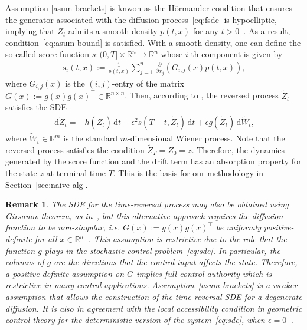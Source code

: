 \documentclass[letterpaper, 10 pt, conference]{ieeeconf}  %
\def\Re{\mathbb{R}}
\def\R{\mathbb{R}}
\newcommand{\field}[1]{\mathbb{#1}}
\def\Re{\field{R}}
\def\R{\mathbb{R}}
\newtheorem{remark}{Remark}
\newcommand{\ud}{\,\mathrm{d}}
\def\Re{\mathbb{R}}
\renewcommand{\Re}{\mathbb{R}}
\begin{document}
Assumption \ref{asum-brackets} is knwon as the H\"ormander condition that ensures the generator associated with the diffusion process~\eqref{eq:fsde} is hypoelliptic, implying that $Z_t$ admits a smooth density $p(t,x)$ for any $t>0$~\cite{chaleyat1984hypoellipticity,hormander1967hypoelliptic}. As a result, condition~\eqref{eq:asum-bound} is satisfied. With a smooth density, one can define the so-called score function $s:(0,T] \times \Re^n \to \Re^n$ whose $i$-th component is given by
  \begin{align}\label{eq:score-def}
            s_i(t,x) \mathrel{:=} \frac{1}{p(t,x)} \sum_{j=1}^n  \frac{\partial}{\partial x_j}(G_{i,j}(x)p(t,x)),
        \end{align}
        where $G_{i,j}(x)$ is the $(i,j)$-entry of the matrix $G(x):=g(x)g(x)^\top \in \R^{n\times n}$. 
Then, according to \cite[Thm. 2.1]{haussmann1986time},
the reversed process $\tilde Z_t$ satisfies the SDE
\begin{align}
            \ud \tilde{Z}_t = -h(\tilde Z_t)\ud t +  \epsilon^2 s(T-t,\tilde Z_t) \ud t+ \epsilon g(\tilde{Z}_t) \ud  \tilde W_t,    \label{eq:tr-sde} 
        \end{align}
        where $\tilde W_t \in \R^m$ is the standard $m$-dimensional Wiener process. Note that the reversed process satisfies the condition $\tilde Z_T=Z_0 = z$. Therefore, the dynamics generated by the score function and  the drift term has an absorption property for the state $z$ at terminal time $T$. This is the basis for our methodology in Section~\ref{sec:naive-alg}. 
      
         \begin{remark}
        The SDE for the time-reversal process may also be obtained using Girsanov theorem, as in~\cite{cattiaux2023time}, but this alternative approach requires the diffusion function to be non-singular, i.e. $G(x):=g(x)g(x)^\top$ be uniformly positive-definite for all $x\in \R^n$~\cite{anderson1982reverse,cattiaux2023time}. This assumption is restrictive due to the role that the function $g$ plays in the stochastic control problem~\eqref{eq:sde}. In particular, the columns of $g$ are the directions that the control input affects the state. Therefore, a positive-definite assumption on $G$ implies full control authority which is restrictive in many control applications. Assumption~\ref{asum-brackets} is a weaker assumption that allows the construction of the time-reversal SDE for a degenerate diffusion. It is also in agreement with the local accessibility condition in geometric control theory  for the deterministic version of the system~\eqref{eq:sde},  when $\epsilon=0$~\cite{krener1974generalization,sussmann1987general}. 
    \end{remark}
    
\end{document}
